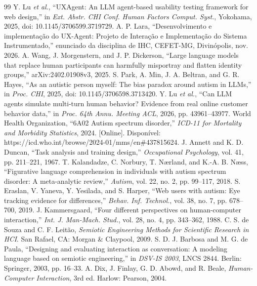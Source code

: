 \begin{thebibliography}{99}
\footnotesize
{} Y. Lu \emph{et al.}, ``UXAgent: An LLM agent-based usability testing framework for web design,'' in \emph{Ext. Abstr. CHI Conf. Human Factors Comput. Syst.}, Yokohama, 2025, doi: 10.1145/3706599.3719729.
 A. P. Lara, ``Desenvolvimento e implementação do UX-Agent: Projeto de Interação e Implementação do Sistema Instrumentado,'' enunciado da disciplina de IHC, CEFET-MG, Divinópolis, nov. 2026.
 A. Wang, J. Morgenstern, and J. P. Dickerson, ``Large language models that replace human participants can harmfully misportray and flatten identity groups,'' arXiv:2402.01908v3, 2025.
 S. Park, A. Min, J. A. Beltran, and G. R. Hayes, ``As an autistic person myself: The bias paradox around autism in LLMs,'' in \emph{Proc. CHI}, 2025, doi: 10.1145/3706598.3713420.
 Y. Lu \emph{et al.}, ``Can LLM agents simulate multi-turn human behavior? Evidence from real online customer behavior data,'' in \emph{Proc. 64th Annu. Meeting ACL}, 2026, pp. 43961--43977.
 World Health Organization, ``6A02 Autism spectrum disorder,'' \emph{ICD-11 for Mortality and Morbidity Statistics}, 2024. [Online]. Disponível: https://icd.who.int/browse/2024-01/mms/en\#437815624.
 J. Annett and K. D. Duncan, ``Task analysis and training design,'' \emph{Occupational Psychology}, vol. 41, pp. 211--221, 1967.
 T. Kalandadze, C. Norbury, T. Nærland, and K.-A. B. Næss, ``Figurative language comprehension in individuals with autism spectrum disorder: A meta-analytic review,'' \emph{Autism}, vol. 22, no. 2, pp. 99--117, 2018.
 S. Eraslan, V. Yaneva, Y. Yesilada, and S. Harper, ``Web users with autism: Eye tracking evidence for differences,'' \emph{Behav. Inf. Technol.}, vol. 38, no. 7, pp. 678--700, 2019.
 J. Kammersgaard, ``Four different perspectives on human-computer interaction,'' \emph{Int. J. Man-Mach. Stud.}, vol. 28, no. 4, pp. 343--362, 1988.
 C. S. de Souza and C. F. Leitão, \emph{Semiotic Engineering Methods for Scientific Research in HCI}. San Rafael, CA: Morgan \& Claypool, 2009.
 S. D. J. Barbosa and M. G. de Paula, ``Designing and evaluating interaction as conversation: A modeling language based on semiotic engineering,'' in \emph{DSV-IS 2003}, LNCS 2844. Berlin: Springer, 2003, pp. 16--33.
 A. Dix, J. Finlay, G. D. Abowd, and R. Beale, \emph{Human-Computer Interaction}, 3rd ed. Harlow: Pearson, 2004.

\end{thebibliography}

